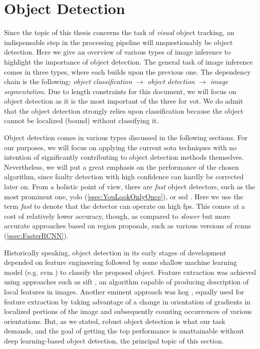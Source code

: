 \section{Object Detection}

Since the topic of this thesis concerns the task of \emph{visual} object tracking, an indispensable step in the processing pipeline will unquestionably be object detection. Here we give an overview of various types of image inference to highlight the importance of object detection. The general task of image inference comes in three types, where each builds upon the previous one. The dependency chain is the following: \emph{object classification} $\to$ \emph{object detection} $\to$ \emph{image segmentation}. Due to length constraints for this document, we will focus on object detection as it is the most important of the three for \gls{vot}. We do admit that the object detection strongly relies upon classification because the object cannot be localized (bound) without classifying it.

Object detection comes in various types discussed in the following sections. For our purposes, we will focus on applying the current \gls{sota} techniques with no intention of significantly contributing to object detection methods themselves. Nevertheless, we will put a great emphasis on the performance of the chosen algorithm, since faulty detection with high confidence can hardly be corrected later on. From a holistic point of view, there are \emph{fast} object detectors, such as the most prominent one, \gls{yolo} \cite{Redmon2016} (\cref{ssec:YouLookOnlyOnce}), or \gls{ssd} \cite{Liu2016}. Here we use the term \emph{fast} to denote that the detector can operate on high \gls{fps}. This comes at a cost of relatively lower accuracy, though, as compared to \emph{slower} but more accurate approaches based on region proposals, such as various versions of \glspl{rcnn} (\cref{ssec:FasterRCNN}).

Historically speaking, object detection in its early stages of development depended on feature engineering followed by some shallow machine learning model (e.g. \gls{svm} \cite{cortes1995support}) to classify the proposed object. Feature extraction was achieved using approaches such as \gls{sift} \cite{Lowe1999}, an algorithm capable of producing description of local features in images. Another eminent approach was \gls{hog} \cite{osti_6007283}, equally used for feature extraction by taking advantage of a change in orientation of gradients in localized portions of the image and subsequently counting occurrences of various orientations. But, as we stated, robust object detection is what our task demands, and the goal of getting the top performance is unattainable without deep learning-based object detection, the principal topic of this section.

